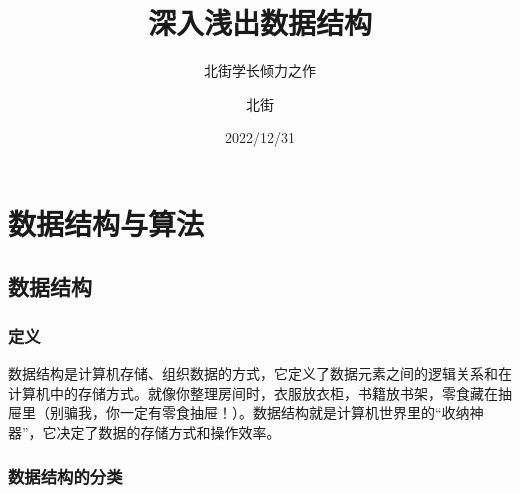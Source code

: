 \documentclass[lang=cn,newtx,10pt,scheme=chinese]{../elegantbook}
\title{深入浅出数据结构}
\subtitle{北街学长倾力之作}
\author{北街}
\date{2022/12/31}
\begin{document}
\maketitle
\frontmatter

\tableofcontents

\mainmatter


\chapter{数据结构与算法}

\section{数据结构}

\subsection{定义}
数据结构是计算机存储、组织数据的方式，它定义了数据元素之间的逻辑关系和在计算机中的存储方式。就像你整理房间时，衣服放衣柜，书籍放书架，零食藏在抽屉里（别骗我，你一定有零食抽屉！）。数据结构就是计算机世界里的“收纳神器”，它决定了数据的存储方式和操作效率。

\subsection{数据结构的分类}
\end{document}

